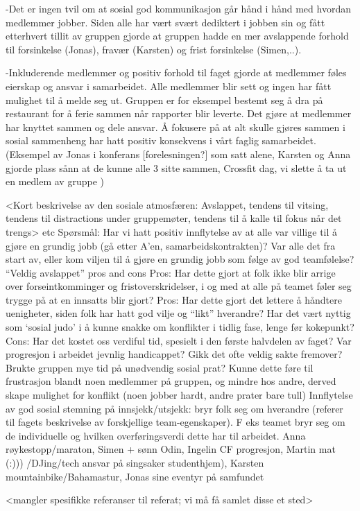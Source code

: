 -Det er ingen tvil om at sosial god kommunikasjon går hånd i hånd med hvordan medlemmer jobber. Siden alle har vært svært dediktert i jobben sin og fått etterhvert tillit av gruppen gjorde at gruppen hadde en mer avslappende forhold til forsinkelse (Jonas), fravær (Karsten) og frist forsinkelse (Simen,..). 

-Inkluderende medlemmer og positiv forhold til faget gjorde at medlemmer føles eierskap og ansvar i samarbeidet. Alle medlemmer blir sett og ingen har fått mulighet til å melde seg ut. Gruppen er for eksempel  bestemt seg å  dra på restaurant for å ferie sammen når rapporter blir leverte. Det gjøre at medlemmer har knyttet sammen og dele ansvar.  Å fokusere på at alt skulle gjøres sammen i sosial sammenheng har hatt positiv konsekvens i vårt faglig samarbeidet. (Eksempel av Jonas i konferans [forelesningen?] som satt alene, Karsten og Anna gjorde plass sånn at de kunne alle 3 sitte sammen, Crossfit dag, vi slette å ta ut en medlem av gruppe )









<Kort beskrivelse av den sosiale atmosfæren: Avslappet, tendens til vitsing, tendens til distractions under gruppemøter, tendens til å kalle til fokus når det trengs>
etc
Spørsmål:
Har vi hatt positiv innflytelse av at alle var villige til å gjøre en grundig jobb (gå etter A’en, samarbeidskontrakten)?
Var alle det fra start av, eller kom viljen til å gjøre en grundig jobb som følge av god teamfølelse?
“Veldig avslappet” pros and cons
Pros: Har dette gjort at folk ikke blir arrige over forseintkomminger og fristoverskridelser, i og med at alle på teamet føler seg trygge på at en innsatts blir gjort? 
Pros: Har dette gjort det lettere å håndtere uenigheter, siden folk har hatt god vilje og “likt” hverandre?
Har det vært nyttig som ‘sosial judo’ i å kunne snakke om konflikter i tidlig fase, lenge før kokepunkt?
Cons: Har det kostet oss verdiful tid, spesielt i den første halvdelen av faget? Var progresjon i arbeidet jevnlig handicappet? Gikk det ofte veldig sakte fremover? Brukte gruppen mye tid på unødvendig sosial prat? Kunne dette føre til frustrasjon blandt noen medlemmer på gruppen, og mindre hos andre, derved skape mulighet for konflikt (noen jobber hardt, andre prater bare tull)
Innflytelse av god sosial stemning på innsjekk/utsjekk: bryr folk seg om hverandre (referer til fagets beskrivelse av forskjellige team-egenskaper). F eks teamet bryr seg om de individuelle og hvilken overføringsverdi dette har til arbeidet.
 Anna røykestopp/maraton, Simen + sønn Odin, Ingelin CF progresjon, Martin mat (:))) /DJing/tech ansvar på singsaker studenthjem), Karsten mountainbike/Bahamastur, Jonas sine eventyr på samfundet 

<mangler spesifikke referanser til referat; vi må få samlet disse et sted>
